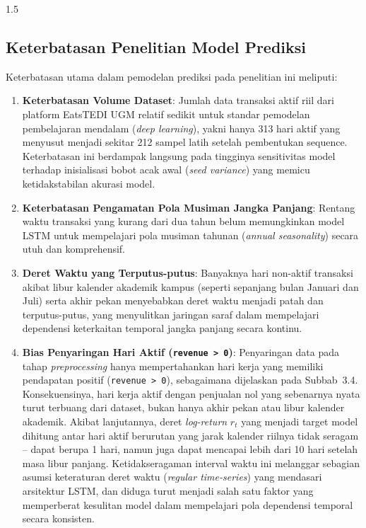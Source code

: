 \documentclass[12pt, a4paper, onecolumn, oneside]{report}
\begin{document}
\begin{spacing}{1.5}
\subsection{Keterbatasan Penelitian Model Prediksi}

Keterbatasan utama dalam pemodelan prediksi pada penelitian ini meliputi:
\begin{enumerate}
    \item \textbf{Keterbatasan Volume Dataset}: Jumlah data transaksi aktif riil dari platform EatsTEDI UGM relatif sedikit untuk standar pemodelan pembelajaran mendalam (\textit{deep learning}), yakni hanya 313 hari aktif yang menyusut menjadi sekitar 212 sampel latih setelah pembentukan sequence. Keterbatasan ini berdampak langsung pada tingginya sensitivitas model terhadap inisialisasi bobot acak awal (\textit{seed variance}) yang memicu ketidakstabilan akurasi model.
    
    \item \textbf{Keterbatasan Pengamatan Pola Musiman Jangka Panjang}: Rentang waktu transaksi yang kurang dari dua tahun belum memungkinkan model LSTM untuk mempelajari pola musiman tahunan (\textit{annual seasonality}) secara utuh dan komprehensif.
    
    \item \textbf{Deret Waktu yang Terputus-putus}: Banyaknya hari non-aktif transaksi akibat libur kalender akademik kampus (seperti sepanjang bulan Januari dan Juli) serta akhir pekan menyebabkan deret waktu menjadi patah dan terputus-putus, yang menyulitkan jaringan saraf dalam mempelajari dependensi keterkaitan temporal jangka panjang secara kontinu.

    \item \textbf{Bias Penyaringan Hari Aktif (\texttt{revenue > 0})}: Penyaringan data pada tahap \textit{preprocessing} hanya mempertahankan hari kerja yang memiliki pendapatan positif (\texttt{revenue > 0}), sebagaimana dijelaskan pada Subbab~3.4. Konsekuensinya, hari kerja aktif dengan penjualan nol yang sebenarnya nyata turut terbuang dari dataset, bukan hanya akhir pekan atau libur kalender akademik. Akibat lanjutannya, deret \textit{log-return} $r_t$ yang menjadi target model dihitung antar hari aktif berurutan yang jarak kalender riilnya tidak seragam -- dapat berupa 1 hari, namun juga dapat mencapai lebih dari 10 hari setelah masa libur panjang. Ketidakseragaman interval waktu ini melanggar sebagian asumsi keteraturan deret waktu (\textit{regular time-series}) yang mendasari arsitektur LSTM, dan diduga turut menjadi salah satu faktor yang memperberat kesulitan model dalam mempelajari pola dependensi temporal secara konsisten.
\end{enumerate}


\end{spacing}
\end{document}
